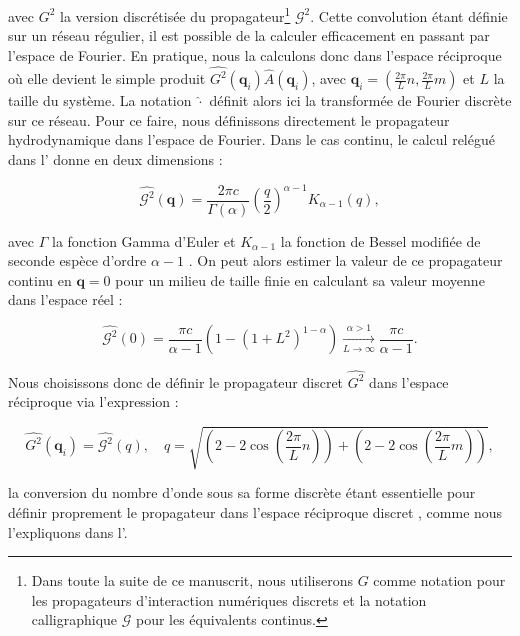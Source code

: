 \noindent avec $G^2$ la version discrétisée du propagateur\footnote{Dans toute la suite de ce manuscrit, nous utiliserons $G$ comme notation pour les propagateurs d'interaction numériques discrets et la notation calligraphique $\mathcal{G}$ pour les équivalents continus.} $\mathcal{G}^2$. Cette convolution étant définie sur un réseau régulier, il est possible de la calculer efficacement en passant par l'espace de Fourier. En pratique, nous la calculons donc dans l'espace réciproque où elle devient le simple produit $\hat{G^2}(\mathbf{q}_i)\hat{A}(\mathbf{q}_i)$, avec $\mathbf{q}_i = (\frac{2\pi}{L}n, \frac{2\pi}{L}m)$ et $L$ la taille du système. La notation $\hat{\cdot}$ définit alors ici la transformée de Fourier discrète sur ce réseau. Pour ce faire, nous définissons directement le propagateur hydrodynamique dans l'espace de Fourier. Dans le cas continu, le calcul relégué dans l' donne en deux dimensions :

\begin{equation}
	\hat{\mathcal{G}^2}(\mathbf{q})=\frac{2\pi c}{\Gamma\left(\alpha\right)} \left( \frac{q}{2} \right)^{\alpha-1}K_{\alpha-1}(q),
	\label{eq:propcontinu2D}
\end{equation}

\noindent avec $\Gamma$ la fonction Gamma d'Euler et $K_{\alpha -1}$ la fonction de Bessel modifiée de seconde espèce d'ordre $\alpha - 1$ \cite{abramowitz_handbook_1965}. On peut alors estimer la valeur de ce propagateur continu en $\mathbf{q}=0$ pour un milieu de taille finie en calculant sa valeur moyenne dans l'espace réel :

\begin{equation}
	\hat{\mathcal{G}^2}(0) = \frac{\pi c}{\alpha -1}\left( 1- \left( 1+L^2 \right)^{1-\alpha} \right) \xrightarrow[L\rightarrow\infty]{\alpha > 1} \frac{\pi c}{\alpha - 1}.
	\label{eq:zerovalue}
\end{equation}

\noindent Nous choisissons donc de définir le propagateur discret $\hat{G^2}$ dans l'espace réciproque via l'expression :

\begin{equation}
	\hat{G^2}(\mathbf{q}_i) = \hat{\mathcal{G}^2}(q), \quad q = \sqrt{\left( 2-2\cos \left( \frac{2\pi}{L}n \right) \right) + \left( 2-2\cos \left( \frac{2\pi}{L}m \right) \right)},
\end{equation}

\noindent la conversion du nombre d'onde sous sa forme discrète étant essentielle pour définir proprement le propagateur dans l'espace réciproque discret \cite{ferrero_criticality_2019, rossi_finite-disorder_2022}, comme nous l'expliquons dans l'.

